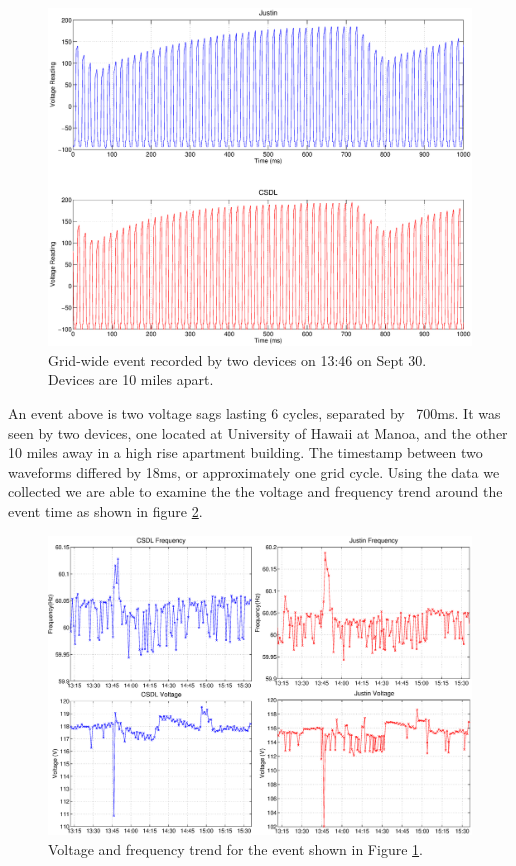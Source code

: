 \begin{figure}[h!]
\centering
\includegraphics[width=\textwidth]{img/gridwide.eps}
\caption{Grid-wide event recorded by two devices on 13:46 on Sept 30. Devices are 10 miles apart.}
\label{fig:grid}
\end{figure} 

An event above is two voltage sags lasting 6 cycles, separated by ~700ms. It was seen by two devices, one located at University of Hawaii at Manoa, and the other 10 miles away in a high rise
apartment building. The timestamp between two waveforms differed by 18ms, or approximately one grid cycle. Using the data we collected we are able to examine the the voltage and frequency trend
around the event time as shown in figure \ref{fig:trends}.

\begin{figure}[h!]
\centering
\includegraphics[width=1\textwidth]{img/gridwide_trends.eps}
\caption{Voltage and frequency trend for the event shown in Figure \ref{fig:grid}.}
\label{fig:trends}
\end{figure} 

